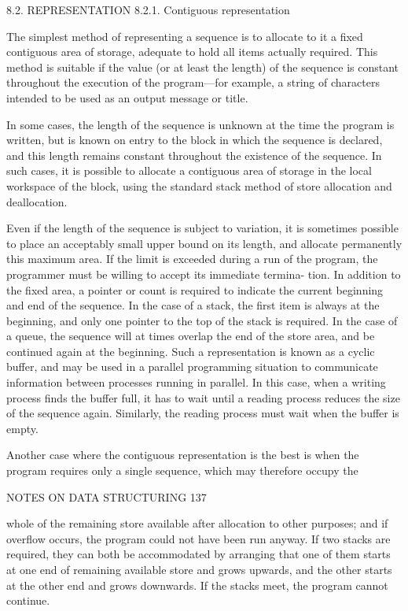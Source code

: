 {{{{				8.2. REPRESENTATION 8.2.1. Contiguous representation
				
				The simplest method of representing a sequence is to allocate to it a fixed contiguous area of storage, adequate to hold all items actually required. This method is suitable if the value (or at least the length) of the sequence is constant throughout the execution of the program—for example, a string of characters intended to be used as an output message or title.
				
				In some cases, the length of the sequence is unknown at the time the program is written, but is known on entry to the block in which the sequence is declared, and this length remains constant throughout the existence of the sequence. In such cases, it is possible to allocate a contiguous area of storage in the local workspace of the block, using the standard stack method of store allocation and deallocation.
				
				Even if the length of the sequence is subject to variation, it is sometimes possible to place an acceptably small upper bound on its length, and allocate permanently this maximum area. If the limit is exceeded during a run of the program, the programmer must be willing to accept its immediate termina- tion. In addition to the fixed area, a pointer or count is required to indicate the current beginning and end of the sequence. In the case of a stack, the first item is always at the beginning, and only one pointer to the top of the stack is required. In the case of a queue, the sequence will at times overlap the end of the store area, and be continued again at the beginning. Such a representation is known as a cyclic buffer, and may be used in a parallel programming situation to communicate information between processes running in parallel. In this case, when a writing process finds the buffer full, it has to wait until a reading process reduces the size of the sequence again. Similarly, the reading process must wait when the buffer is empty.
				
				Another case where the contiguous representation is the best is when the program requires only a single sequence, which may therefore occupy the
				
				NOTES ON DATA STRUCTURING 137
				
				whole of the remaining store available after allocation to other purposes; and if overflow occurs, the program could not have been run anyway. If two stacks are required, they can both be accommodated by arranging that one of them starts at one end of remaining available store and grows upwards, and the other starts at the other end and grows downwards. If the stacks meet, the program cannot continue.
				
}}}}
